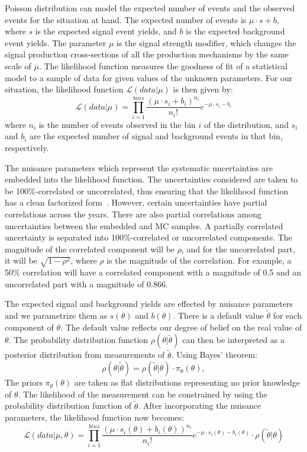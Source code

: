 Poisson distribution can model the expected number of events and the observed events for the situation at hand. The expected number of events is $\mu\cdot s + b$, where $s$ is the expected signal event yields, and $b$ is the expected background event yields. The parameter $\mu$ is the signal strength modifier, which changes the signal production cross-sections of all the production mechanisms by the same scale of $\mu$. The likelihood function measures the goodness of fit of a statistical model to a sample of data for given values of the unknown parameters. For our situation, the likelihood function $\mathcal{L}(data|\mu)$ is then given by:
\begin{equation}
  \mathcal{L}(data|\mu)=\prod_{i=1}^{bins}\frac{(\mu\cdot s_i + b_i)^{n_i}}{n_{i}!}e^{-\mu\cdot s_i - b_i}
\end{equation}
where $n_i$ is the number of events observed in the bin $i$ of the distribution, and $s_i$ and $b_i$ are the expected number of signal and background events in that bin, respectively.

The nuisance parameters which represent the systematic uncertainties are embedded into the likelihood function. The uncertainties considered are taken to be 100\%-correlated or uncorrelated, thus ensuring that the likelihood function has a clean factorized form~\cite{ATLAS:2011tau}. However, certain uncertainties have partial correlations across the years. There are also partial correlations among uncertainties between the embedded and MC samples. A partially correlated uncertainty is separated into 100\%-correlated or uncorrelated components.
The magnitude of the correlated component will be $\rho$, and for the uncorrelated part, it will be $\sqrt{1-\rho^{2}}$, where $\rho$ is the magnitude of the correlation. For example, a 50\% correlation will have a correlated component with a magnitude of 0.5 and an uncorrelated part with a magnitude of 0.866.

The expected signal and background yields are effected by nuisance parameters and we parametrize them as $s(\theta)$ and $b(\theta)$. There is a default value $\tilde{\theta}$ for each component of $\theta$. The default value reflects our degree of belief on the real value of $\theta$. The probability distribution function $\rho(\theta|\tilde{\theta})$ can then be interpreted as a posterior distribution from measurements of $\tilde{\theta}$. Using Bayes' theorem:
\begin{equation}
  \rho(\theta|\tilde{\theta})=\rho(\tilde{\theta}|\theta)\cdot\pi_\theta(\theta),
\end{equation}
The priors $\pi_\theta(\theta)$ are taken as flat distributions representing no prior knowledge of $\theta$. The likelihood of the measurement can be constrained by using the probability distribution function of $\tilde{\theta}$. After incorporating the nuisance parameters, the likelihood function now becomes:
\begin{equation}
  \mathcal{L}(data|\mu,\theta)=\prod_{i=1}^{bins}\frac{(\mu\cdot s_i(\theta) + b_i(\theta))^{n_i}}{n_{i}!}e^{-\mu\cdot s_i(\theta) - b_i(\theta)}\cdot\rho(\tilde{\theta}|\theta)
\end{equation}

